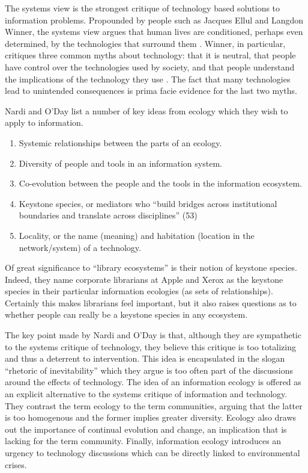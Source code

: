 The systems view is the strongest critique of technology based solutions to information problems. Propounded by people such as Jacques Ellul and Langdon Winner, the systems view argues that human lives are conditioned, perhaps even determined, by the technologies that surround them \citep{ellul_technological_1964, winner_autonomous_1977}. Winner, in particular, critiques three common myths about technology: that it is neutral, that people have control over the technologies used by society, and that people understand the implications of the technology they use \citep[ch. 4]{nardi_information_1999}. The fact that many technologies lead to unintended consequences is prima facie evidence for the last two myths.

Nardi and O'Day list a number of key ideas from ecology which they wish to apply to information.

\begin{enumerate}
\item Systemic relationships between the parts of an ecology.
\item Diversity of people and tools in an information system.
\item Co-evolution between the people and the tools in the information ecosystem.
\item Keystone species, or mediators who ``build bridges across institutional boundaries and translate across disciplines'' (53)
\item Locality, or the name (meaning) and habitation (location in the network/system) of a technology.
\end{enumerate}

Of great significance to ``library ecosystems'' is their notion of keystone species. Indeed, they name corporate librarians at Apple and Xerox as the keystone species in their particular information ecologies (as sets of relationships). Certainly this makes librarians feel important, but it also raises questions as to whether people can really be a keystone species in any ecosystem.

The key point made by Nardi and O'Day is that, although they are sympathetic to the systems critique of technology, they believe this critique is too totalizing and thus a deterrent to intervention. This idea is encapsulated in the slogan ``rhetoric of inevitability'' which they argue is too often part of the discussions around the effects of technology. The idea of an information ecology is offered as an explicit alternative to the systems critique of information and technology. They contrast the term ecology to the term communities, arguing that the latter is too homogenous and the former implies greater diversity. Ecology also draws out the importance of continual evolution and change, an implication that is lacking for the term community.  Finally, information ecology introduces an urgency to technology discussions which can be directly linked to environmental crises.

